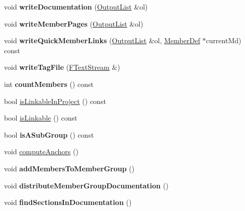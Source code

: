 \begin{DoxyCompactItemize}
void {\bfseries write\+Documentation} (\mbox{\hyperlink{class_output_list}{Output\+List}} \&ol)
\item 
\mbox{\label{class_group_def_a38ce5bec40660b86d497f2fc13883f24}} 
void {\bfseries write\+Member\+Pages} (\mbox{\hyperlink{class_output_list}{Output\+List}} \&ol)
\item 
\mbox{\label{class_group_def_abdae0b34fd964d6bfcd56a55c498cf41}} 
void {\bfseries write\+Quick\+Member\+Links} (\mbox{\hyperlink{class_output_list}{Output\+List}} \&ol, \mbox{\hyperlink{class_member_def}{Member\+Def}} $\ast$current\+Md) const
\item 
\mbox{\label{class_group_def_af8ce245c3b6ba9fc5b8e575995205913}} 
void {\bfseries write\+Tag\+File} (\mbox{\hyperlink{class_f_text_stream}{F\+Text\+Stream}} \&)
\item 
\mbox{\label{class_group_def_a05b8e6bf1505a6cac7b2a9900cab33a6}} 
int {\bfseries count\+Members} () const
\item 
bool \mbox{\hyperlink{class_group_def_a916a94699f6234e2bf5594ff12bbf764}{is\+Linkable\+In\+Project}} () const
\item 
bool \mbox{\hyperlink{class_group_def_a6aeb6d9849dfceb7809cfbda4bfb2503}{is\+Linkable}} () const
\item 
\mbox{\label{class_group_def_a5a4165b8351e635ad6287f9ca92ad8e2}} 
bool {\bfseries is\+A\+Sub\+Group} () const
\item 
void \mbox{\hyperlink{class_group_def_a2b3099f398ccdb867feab801bcb970cd}{compute\+Anchors}} ()
\item 
\mbox{\label{class_group_def_a48d0c12da606726845d4c8005127c57e}} 
void {\bfseries add\+Members\+To\+Member\+Group} ()
\item 
\mbox{\label{class_group_def_a1b4853a1afc605da80f743dfee17b48e}} 
void {\bfseries distribute\+Member\+Group\+Documentation} ()
\item 
\mbox{\label{class_group_def_a66bdfe8ee9631c175ba9433829c0e0a6}} 
void {\bfseries find\+Sections\+In\+Documentation} ()
\item 

\end{DoxyCompactItemize}
